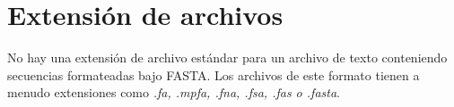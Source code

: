 \section{Extensión de archivos}
	\par No hay una extensión de archivo estándar para un archivo de texto conteniendo secuencias formateadas bajo \textsc{FASTA}. Los archivos de este 	formato tienen a menudo extensiones como \textit{.fa, .mpfa, .fna, .fsa, .fas o .fasta}.

